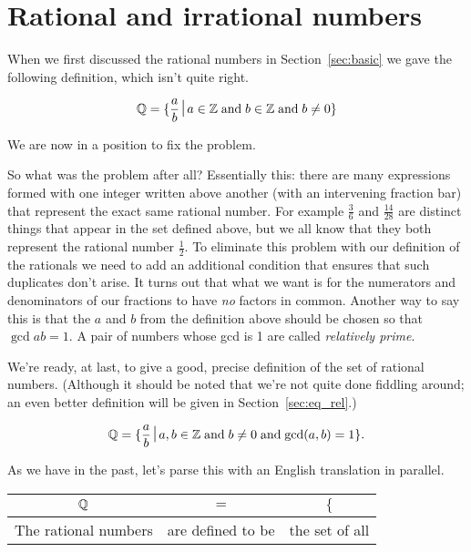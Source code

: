 \newpage
  



\newpage

\section{Rational and irrational numbers}
\label{sec:rat}

When we first discussed the rational numbers in Section~\ref{sec:basic}
we gave the following definition, which isn't quite right.

\[ \Rationals = \{ \frac{a}{b} \suchthat a \in \Integers \; \mbox{and} \;
b \in \Integers \; \mbox{and} \; b \neq 0 \} \]

We are now in a position to fix the problem.

So what was the problem after all?  Essentially this: there are
many expressions formed with one integer written above another (with an
intervening fraction bar) that represent the exact same rational
number.  For example $\frac{3}{6}$ and $\frac{14}{28}$ are distinct
things that appear in the set defined above, but we all know that they
both represent the rational number $\frac{1}{2}$.  To eliminate this
problem with our definition of the rationals we need to add an
additional condition that ensures that such duplicates don't arise. 
It turns out that what we want is for the numerators and denominators
of our fractions to have {\em no} factors in common.  Another way to
say this is that the $a$ and $b$ from the definition above should be
chosen so that $\gcd{a}{b} = 1$.  A pair of numbers whose gcd is 1 are
called  \emph{relatively prime}.

We're ready, at last, to give a good, precise  definition of the set
of rational numbers.   (Although it should be noted that we're not
quite done fiddling around; an even better definition will be given in
Section~\ref{sec:eq_rel}.)  

\[ \Rationals = \{ \frac{a}{b} \suchthat a,b \in \Integers \; \mbox{and} \;
b \neq 0 \; \mbox{and} \; \gcd{a}{b}=1 \}. \]

As we have in the past, let's parse this with an English translation in parallel.

\vspace{.2in}

\begin{tabular}{c|c|c}
\rule[-10pt]{0pt}{22pt} ${\mathbb Q}$ & $=$ & $\{$  \\ \hline
\rule[-6pt]{0pt}{22pt} The rational numbers & are defined to be & the set of all\\
\end{tabular}

